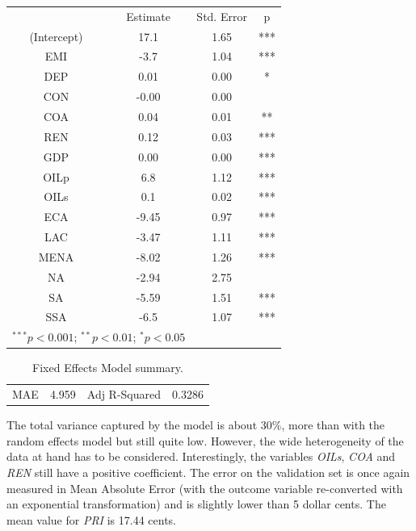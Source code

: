 \documentclass{book}
\begin{document}
\bigskip
\begin{table}[H]
\begin{center}
\begin{tabular}{|c|c|c|c|}
\hline
\rowcolor{lightgray} \multicolumn{4}{|c|}{Coefficients}\\
\hline
&Estimate&Std. Error&p\\
\hline
(Intercept)&17.1&1.65&***\\
EMI&-3.7&1.04&***\\
DEP&0.01&0.00&*\\
CON&-0.00&0.00&\\
COA&0.04&0.01&**\\
REN&0.12&0.03&***\\
GDP&0.00&0.00&***\\
OILp&6.8&1.12&***\\
OILs&0.1&0.02&***\\
ECA&-9.45&0.97&***\\
LAC&-3.47&1.11&***\\
MENA&-8.02&1.26&***\\
NA&-2.94&2.75&\\
SA&-5.59&1.51&***\\
SSA&-6.5&1.07&***\\
\hline
\multicolumn{2}{l}{\scriptsize{$^{***}p<0.001$; $^{**}p<0.01$; $^{*}p<0.05$}}\\
\end{tabular}
\end{center}
\end{table}
\begin{table}[H]
\begin{center}
\begin{tabular}{|c|c|c|c|}
\hline
\rowcolor{maroon} \multicolumn{4}{|c|}{Global Performance}\\
\hline
MAE&4.959&Adj R-Squared&0.3286\\
\hline
\end{tabular}
\caption{Fixed Effects Model summary.}
\end{center}
\end{table}
\bigskip

The total variance captured by the model is about 30\%, more than with the random effects model but still quite low. However, the wide heterogeneity of the data at hand has to be considered. Interestingly, the variables \textit{OILs}, \textit{COA} and \textit{REN} still have a positive coefficient. The error on the validation set is once again measured in Mean Absolute Error (with the outcome variable re-converted with an exponential transformation) and is slightly lower than 5 dollar cents. The mean value for \textit{PRI} is 17.44 cents.
\end{document}
